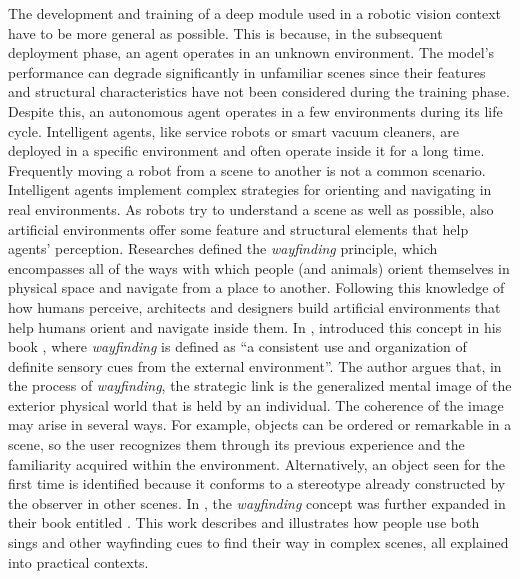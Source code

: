 The development and training of a deep module used in a robotic vision context have to be more general as possible. This is because, in the subsequent deployment phase, an agent operates in an unknown environment. The model's performance can degrade significantly in unfamiliar scenes since their features and structural characteristics have not been considered during the training phase. Despite this, an autonomous agent operates in a few environments during its life cycle. Intelligent agents, like service robots or smart vacuum cleaners, are deployed in a specific environment and often operate inside it for a long time. Frequently moving a robot from a scene to another is not a common scenario. Intelligent agents implement complex strategies for orienting and navigating in real environments. As robots try to understand a scene as well as possible, also artificial environments offer some feature and structural elements that help agents' perception. Researches defined the \textit{wayfinding} principle, which encompasses all of the ways with which people (and animals) orient themselves in physical space and navigate from a place to another. Following this knowledge of how humans perceive, architects and designers build artificial environments that help humans orient and navigate inside them. In \citeyear{imageofcity}, \citeauthor{imageofcity} introduced this concept in his book , where \textit{wayfinding} is defined as ``a consistent use and organization of definite sensory cues from the external environment''.  The author argues that, in the process of \textit{wayfinding}, the strategic link is the generalized mental image of the exterior physical world that is held by an individual. The coherence of the image may arise in several ways. For example, objects can be ordered or remarkable in a scene, so the user recognizes them through its previous experience and the familiarity acquired within the environment. Alternatively, an object seen for the first time is identified because it
conforms to a stereotype already constructed by the observer in other scenes. In \citeyear{wayfinding}, the \textit{wayfinding} concept was further expanded in their book entitled  \cite{wayfinding}. This work describes and illustrates how people use both sings and other wayfinding cues to find their way in complex scenes, all explained into practical contexts. 
